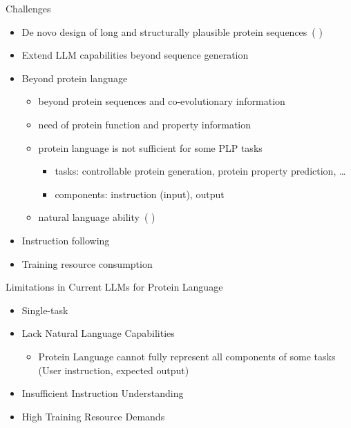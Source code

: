 \documentclass[dvipsnames,
hyperref={
	citecolor=blue,
	colorlinks=true,
	urlcolor=blue,
	linkcolor=,
}
]{beamer}
\let\oldcite\cite
\renewcommand{\cite}[1]{{\color{blue} \oldcite{#1}}}
\begin{document}
\begin{frame}{Challenges}%
	\begin{itemize}\setlength\itemsep{1.5em}
		\item De novo design of long and structurally plausible protein
		sequences~(\cite{ferruz2022protgpt2}) %
		\item Extend LLM capabilities beyond sequence generation
		\item Beyond protein language
		\begin{itemize}
			\item beyond protein sequences and co-evolutionary
			information
			\item need of protein function and property information
			\item protein language is not sufficient for some PLP tasks
			\begin{itemize}
				\item tasks: controllable protein generation, protein property prediction, \dots
				\item components: instruction (input), output
			\end{itemize}
			\item natural language ability~(\cite{xu2023protst,wang2023instructprotein})
		\end{itemize}
		\item Instruction following
		\item Training resource consumption
	\end{itemize}
\end{frame}

\begin{frame}{Limitations in Current LLMs for Protein Language}
	\begin{itemize}\setlength\itemsep{3em}
		\item Single-task
		\item Lack Natural Language Capabilities
		\begin{itemize}
			\item Protein Language cannot fully represent all components of some tasks (User instruction, expected output)
		\end{itemize}
		\item Insufficient Instruction Understanding
		\item High Training Resource Demands
	\end{itemize}
\end{frame}
\end{document}
